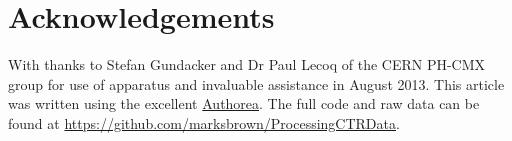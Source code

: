 \section*{Acknowledgements}
With thanks to Stefan Gundacker and Dr Paul Lecoq of the CERN PH-CMX group for use of apparatus and invaluable assistance in August 2013. This article was written using the excellent \href{www.authorea.com}{Authorea}. The full code and raw data can be found at \href{https://github.com/marksbrown/ProcessingCTRData}{https://github.com/marksbrown/ProcessingCTRData}.